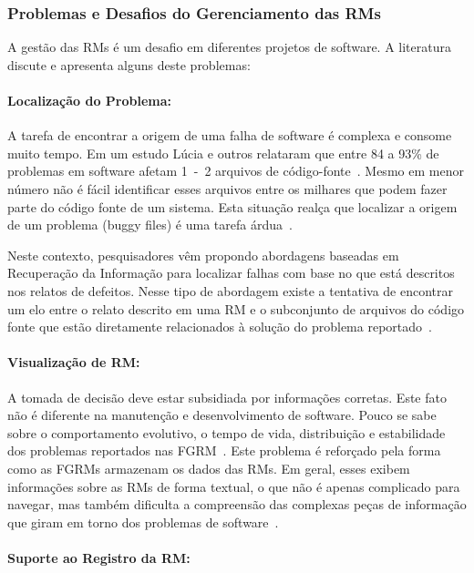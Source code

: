 \subsubsection{Problemas e Desafios do Gerenciamento das RMs}
\label{ssub:problemas_relacionadas_rm}

A gestão das RMs é um desafio em diferentes projetos de software. A literatura
discute e apresenta alguns deste problemas:

\paragraph{Localização do Problema:}

A tarefa de encontrar a origem de uma falha de software é complexa e consome
muito tempo. Em um estudo Lúcia e outros relataram que entre 84 a 93\% de
problemas em software afetam 1~-~2 arquivos de
código-fonte~\cite{thung2012faults}. Mesmo em menor número não é fácil
identificar esses arquivos entre os milhares que podem fazer parte do código
fonte de um sistema. Esta situação realça que localizar a origem de um problema
(buggy files) é uma tarefa árdua~\cite{Thung:2014:BIT:2635868.2661678}.

Neste contexto, pesquisadores vêm propondo abordagens baseadas em Recuperação da
Informação para localizar falhas com base no que está descritos nos relatos de
defeitos. Nesse tipo de abordagem existe a tentativa de encontrar um elo entre o
relato descrito em uma RM e o subconjunto de arquivos do código fonte que estão
diretamente relacionados à solução do problema
reportado~\cite{Wong:2014:BBF:2705615.2706096}.

\paragraph{Visualização de RM:}

A tomada de decisão deve estar subsidiada por informações corretas. Este fato
não é diferente na manutenção e desenvolvimento de software. Pouco se sabe sobre
o comportamento evolutivo, o tempo de vida, distribuição e estabilidade dos
problemas reportados nas FGRM~\cite{hora2012bug}. Este problema é reforçado pela
forma como as FGRMs armazenam os dados das RMs. Em geral, esses exibem
informações sobre as RMs de forma textual, o que não é apenas complicado para
navegar, mas também dificulta a compreensão das complexas peças de informação
que giram em torno dos problemas de software~\cite{dal2014bug}.

\paragraph{Suporte ao Registro da RM:}

